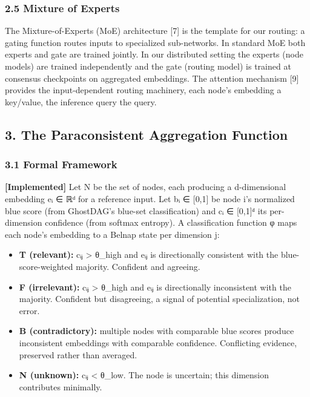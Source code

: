 \subsubsection{2.5 Mixture of Experts}\label{mixture-of-experts}

The Mixture-of-Experts (MoE) architecture {[}7{]} is the template for
our routing: a gating function routes inputs to specialized
sub-networks. In standard MoE both experts and gate are trained jointly.
In our distributed setting the experts (node models) are trained
independently and the gate (routing model) is trained at consensus
checkpoints on aggregated embeddings. The attention mechanism {[}9{]}
provides the input-dependent routing machinery, each node's embedding a
key/value, the inference query the query.

\subsection{3. The Paraconsistent Aggregation
Function}\label{the-paraconsistent-aggregation-function}

\subsubsection{3.1 Formal Framework}\label{formal-framework}

\textbf{{[}Implemented{]}} Let N be the set of nodes, each producing a
d-dimensional embedding eᵢ ∈ ℝᵈ for a reference input. Let bᵢ ∈
{[}0,1{]} be node i's normalized blue score (from GhostDAG's blue-set
classification) and cᵢ ∈ {[}0,1{]}ᵈ its per-dimension confidence (from
softmax entropy). A classification function φ maps each node's embedding
to a Belnap state per dimension j:

\begin{itemize}
\tightlist
\item
  \textbf{T (relevant):} cᵢⱼ \textgreater{} θ\_high and eᵢⱼ is
  directionally consistent with the blue-score-weighted majority.
  Confident and agreeing.
\item
  \textbf{F (irrelevant):} cᵢⱼ \textgreater{} θ\_high and eᵢⱼ is
  directionally inconsistent with the majority. Confident but
  disagreeing, a signal of potential specialization, not error.
\item
  \textbf{B (contradictory):} multiple nodes with comparable blue scores
  produce inconsistent embeddings with comparable confidence.
  Conflicting evidence, preserved rather than averaged.
\item
  \textbf{N (unknown):} cᵢⱼ \textless{} θ\_low. The node is uncertain;
  this dimension contributes minimally.
\end{itemize}


